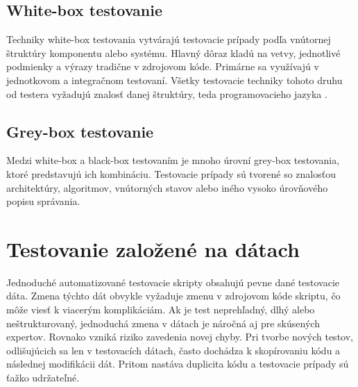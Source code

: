 \subsection*{White-box testovanie}
Techniky white-box testovania vytvárajú testovacie prípady podľa vnútornej štruktúry komponentu alebo systému. Hlavný dôraz kladú na vetvy, jednotlivé podmienky a výrazy tradične v zdrojovom kóde. Primárne sa využívajú v jednotkovom a integračnom testovaní. Všetky testovacie techniky tohoto druhu od testera vyžadujú znalosť danej štruktúry, teda programovacieho jazyka \cite{Gst}.    
\subsection*{Grey-box testovanie}
Medzi white-box a black-box testovaním je mnoho úrovní grey-box testovania, ktoré predstavujú ich kombináciu. Testovacie prípady sú tvorené so znalosťou architektúry, algoritmov, vnútorných stavov alebo iného vysoko úrovňového popisu správania.
\section{Testovanie založené na dátach}
Jednoduché automatizované testovacie skripty obsahujú pevne dané testovacie dáta. Zmena týchto dát obvykle vyžaduje zmenu v zdrojovom kóde skriptu, čo môže viesť k viacerým komplikáciám. Ak je test neprehľadný, dlhý alebo neštrukturovaný, jednoduchá zmena v dátach je náročná aj pre skúsených expertov. Rovnako vzniká riziko zavedenia novej chyby. Pri tvorbe nových testov, odlišujúcich sa len v testovacích dátach, často dochádza k skopírovaniu kódu a následnej modifikácii dát. Pritom nastáva duplicita kódu a testovacie prípady sú ťažko udržateľné. 

